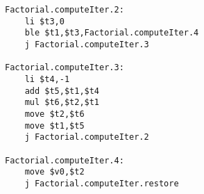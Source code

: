 \documentclass[8pt,a4paper,compress]{beamer}
\begin{document}
\begin{frame}[fragile]
\pause

\begin{lstlisting}[language={}]
Factorial.computeIter.2:
    li $t3,0                                                                                                                                                                                                                                  
    ble $t1,$t3,Factorial.computeIter.4
    j Factorial.computeIter.3

Factorial.computeIter.3:
    li $t4,-1                                                                                                                                                                                                                                 
    add $t5,$t1,$t4
    mul $t6,$t2,$t1                                                                                                                                                                                                                           
    move $t2,$t6                                                                                                                                                                                                                              
    move $t1,$t5                                                                                                                                                                                                                              
    j Factorial.computeIter.2                                                                                                                                                                                                                 
                                                                                                                                                                                                                                              
Factorial.computeIter.4:                                                                                                                                                                                                                      
    move $v0,$t2                                                                                                                                                                                                                              
    j Factorial.computeIter.restore                                                                                                                                                                                                           
                                                                                                                                                                                                                                              

\end{lstlisting}
\end{frame}
\end{document}
